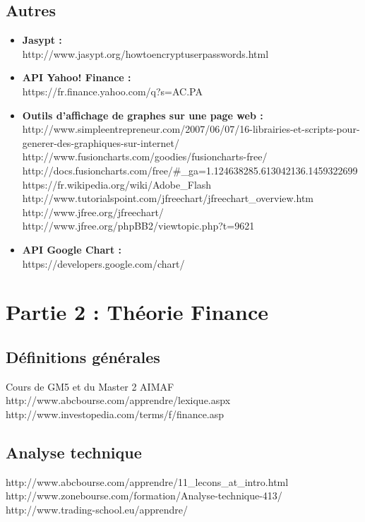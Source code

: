 \subsection{Autres}
\begin{itemize}
 \item \textbf{Jasypt : \\}
    http://www.jasypt.org/howtoencryptuserpasswords.html
 \item \textbf{API Yahoo! Finance : \\}
    https://fr.finance.yahoo.com/q?s=AC.PA
 \item \textbf{Outils d'affichage de graphes sur une page web : \\}   
    http://www.simpleentrepreneur.com/2007/06/07/16-librairies-et-scripts-pour-generer-des-graphiques-sur-internet/ \\
    http://www.fusioncharts.com/goodies/fusioncharts-free/ \\
    http://docs.fusioncharts.com/free/\#\_ga=1.124638285.613042136.1459322699 \\
    https://fr.wikipedia.org/wiki/Adobe\_Flash \\
    http://www.tutorialspoint.com/jfreechart/jfreechart\_overview.htm \\
    http://www.jfree.org/jfreechart/ \\
    http://www.jfree.org/phpBB2/viewtopic.php?t=9621 \\
 \item \textbf{API Google Chart : \\} 
    https://developers.google.com/chart/ \\
\end{itemize}

\section{Partie 2 : Théorie Finance}
\subsection{Définitions générales}
Cours de GM5 et du Master 2 AIMAF \\
http://www.abcbourse.com/apprendre/lexique.aspx\\
http://www.investopedia.com/terms/f/finance.asp

\subsection{Analyse technique}
http://www.abcbourse.com/apprendre/11\_lecons\_at\_intro.html\\
http://www.zonebourse.com/formation/Analyse-technique-413/\\
http://www.trading-school.eu/apprendre/

